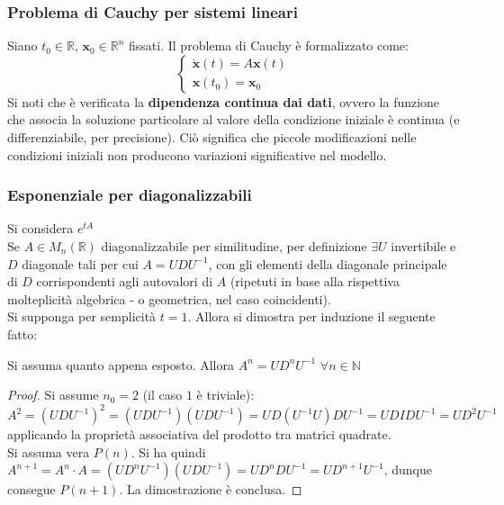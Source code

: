 \documentclass[10pt]{article}
\theoremstyle{plain}
\begin{document}
\subsubsection{Problema di Cauchy per sistemi lineari}
Siano $t_0 \in \mathbb{R}$, $\mathbf{x}_0 \in \mathbb{R}^n$ fissati. Il problema di Cauchy è formalizzato come:
\[\begin{cases}
\dot{\mathbf{x}}(t) = A \mathbf{x}(t)\\
\mathbf{x}(t_0) = \mathbf{x}_0
\end{cases}\]
Si noti che è verificata la \textbf{dipendenza continua dai dati}, ovvero la funzione che associa la soluzione particolare al valore della condizione iniziale è continua (e differenziabile, per precisione). Ciò significa che piccole modificazioni nelle condizioni iniziali non producono variazioni significative nel modello.

\subsubsection{Esponenziale per diagonalizzabili}
Si considera $e^{\displaystyle tA}$
\\Se $A \in M_n(\mathbb{R})$ diagonalizzabile per similitudine, per definizione $\exists U$ invertibile e $D$ diagonale tali per cui $A = U D U^{-1}$, con gli elementi della diagonale principale di $D$ corrispondenti agli autovalori di $A$ (ripetuti in base alla rispettiva molteplicità algebrica - o geometrica, nel caso coincidenti).
\\Si supponga per semplicità $t=1$. Allora si dimostra per induzione il seguente fatto:
\begin{prop}
Si assuma quanto appena esposto. Allora $A^n = U D^n U^{-1}$ $\forall n \in \mathbb{N}$
\end{prop}
\begin{proof}
Si assume $n_0 =2$ (il caso $1$ è triviale): $A^2 = (U D U^{-1})^2 = (U D U^{-1})(U D U^{-1}) = U D (U^{-1} U) D U^{-1} = U D I D U^{-1} = U D^2 U^{-1}$ applicando la proprietà associativa del prodotto tra matrici quadrate.
\\Si assuma vera $P(n)$. Si ha quindi $A^{n+1} = A^n \cdot A = (U D^n U^{-1}) (U D U^{-1}) = U D^n D U^{-1} = U D^{n+1} U^{-1}$, dunque consegue $P(n+1)$. La dimostrazione è conclusa.
\end{proof}
\end{document}

